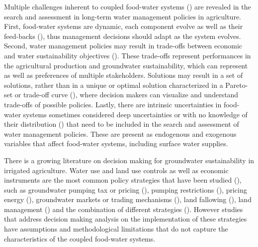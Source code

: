\documentclass[11pt,a4paper]{article}
\begin{document}
Multiple challenges inherent to coupled food-water systems (\cite{polhill_modelling_2016}) are revealed in the search and assessment in long-term water management policies in agriculture. First, food-water systems are dynamic, each component evolve as well as their feed-backs (\cite{filatova_regime_2016}), thus management decisions should adapt as the system evolves. Second, water management policies may result in trade-offs between economic and water sustainability objectives (\cite{mcdermid_minimizing_2021,torhan_tradeoffs_2022,young_hydrologic-economic_2021,stone_economic_2022}). These trade-offs represent performances in the agricultural production and groundwater sustainability, which can represent as well as preferences of multiple stakeholders. Solutions may result in a set of solutions, rather than in a unique or optimal solution characterized in a Pareto-set or trade-off curve (\cite{greening_design_2004,null_pareto_2021}), where decision makers can visualize and understand trade-offs of possible policies. Lastly, there are intrinsic uncertainties in food-water systems sometimes considered deep uncertainties or with no knowledge of their distribution (\cite{stirling_keep_2010}) that need to be included in the search and assessment of water management policies. These are present as endogenous and exogenous variables that affect food-water systems, including surface water supplies. 

There is a growing literature on decision making for groundwater sustainability in irrigated agriculture. Water use and land use controls as well as economic instruments are the most common policy strategies that have been studied (\cite{clifton_water_2010}), such as groundwater pumping tax or pricing (\cite{madani_exogenous_2013,mulligan_assessing_2014,stone_economic_2022}), pumping restrictions (\cite{young_hydrologic-economic_2021,lan_performance_2021,macewan_hydroeconomic_2017}), pricing energy (\cite{hrozencik_impacts_2022}), groundwater markets or trading mechanisms (\cite{khan_effect_2019,kuwayama_regulation_2013}), land fallowing (\cite{van_schmidt_linkages_2022}), land management (\cite{bourque_balancing_2019,li_evaluation_2018,bryant_shaping_2020}) and the combination of different strategies (\cite{graveline_combining_2019,hrozencik_heterogeneous_2017}). However studies that address decision making analysis on the implementation of these strategies have assumptions and methodological limitations that do not capture the characteristics of the coupled food-water systems. 
\end{document}
